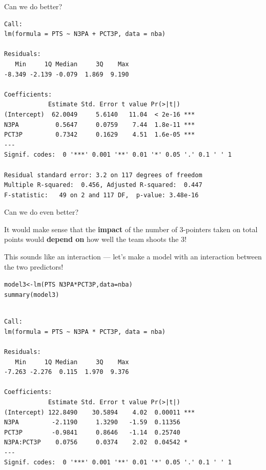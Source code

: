 \documentclass{beamer}\usepackage[]{graphicx}\usepackage[]{color}
\makeatletter
\newcommand{\hlopt}[1]{\textcolor[rgb]{1,0.894,0.769}{#1}}%
\newcommand{\hlstd}[1]{\textcolor[rgb]{1,0.894,0.769}{#1}}%
\newcommand{\hlkwb}[1]{\textcolor[rgb]{0.804,0.776,0.451}{#1}}%
\newcommand{\hlkwc}[1]{\textcolor[rgb]{0.78,0.941,0.545}{#1}}%
\newcommand{\hlkwd}[1]{\textcolor[rgb]{1,0.78,0.769}{#1}}%
\newenvironment{kframe}{%
 \def\at@end@of@kframe{}%
 \ifinner\ifhmode%
  \def\at@end@of@kframe{\end{minipage}}%
  \begin{minipage}{\columnwidth}%
 \fi\fi%
 \def\FrameCommand##1{\hskip\@totalleftmargin \hskip-\fboxsep
 \colorbox{shadecolor}{##1}\hskip-\fboxsep
     \hskip-\linewidth \hskip-\@totalleftmargin \hskip\columnwidth}%
 \MakeFramed {\advance\hsize-\width
   \@totalleftmargin\z@ \linewidth\hsize
   \@setminipage}}%
 {\par\unskip\endMakeFramed%
 \at@end@of@kframe}
\newenvironment{knitrout}{}{} %
\makeatother
\begin{document}
\begin{darkframes}
\begin{frame}[fragile]{Can we do better?}
\begin{knitrout}
\begin{kframe}
\begin{verbatim}
Call:
lm(formula = PTS ~ N3PA + PCT3P, data = nba)

Residuals:
   Min     1Q Median     3Q    Max 
-8.349 -2.139 -0.079  1.869  9.190 

Coefficients:
            Estimate Std. Error t value Pr(>|t|)    
(Intercept)  62.0049     5.6140   11.04  < 2e-16 ***
N3PA          0.5647     0.0759    7.44  1.8e-11 ***
PCT3P         0.7342     0.1629    4.51  1.6e-05 ***
---
Signif. codes:  0 '***' 0.001 '**' 0.01 '*' 0.05 '.' 0.1 ' ' 1

Residual standard error: 3.2 on 117 degrees of freedom
Multiple R-squared:  0.456,	Adjusted R-squared:  0.447 
F-statistic:   49 on 2 and 117 DF,  p-value: 3.48e-16
\end{verbatim}
\end{kframe}
\end{knitrout}
      \lc
\end{frame}

    \begin{frame}{Can we do even better?}
      \begin{center}
        It would make sense that the \textbf{impact} of the number of 3-pointers taken on total points would \textbf{depend on} how well the team shoots the 3!

        \pause\bigskip

        This sounds like an interaction --- let's make a model with an interaction between the two predictors!
      \end{center}
    \end{frame}
    
\begin{frame}[fragile]
      \fontsize{8}{8}\selectfont
\begin{knitrout}
\begin{kframe}
\begin{alltt}
\hlstd{model3} \hlkwb{<-} \hlkwd{lm}\hlstd{(PTS} \hlopt{~} \hlstd{N3PA} \hlopt{*} \hlstd{PCT3P,} \hlkwc{data}\hlstd{=nba)}
\hlkwd{summary}\hlstd{(model3)}
\end{alltt}
\begin{verbatim}

Call:
lm(formula = PTS ~ N3PA * PCT3P, data = nba)

Residuals:
   Min     1Q Median     3Q    Max 
-7.263 -2.276  0.115  1.970  9.376 

Coefficients:
            Estimate Std. Error t value Pr(>|t|)    
(Intercept) 122.8490    30.5894    4.02  0.00011 ***
N3PA         -2.1190     1.3290   -1.59  0.11356    
PCT3P        -0.9841     0.8646   -1.14  0.25740    
N3PA:PCT3P    0.0756     0.0374    2.02  0.04542 *  
---
Signif. codes:  0 '***' 0.001 '**' 0.01 '*' 0.05 '.' 0.1 ' ' 1


\end{verbatim}
\end{kframe}
\end{knitrout}
\end{frame}
\end{darkframes}
\end{document}
